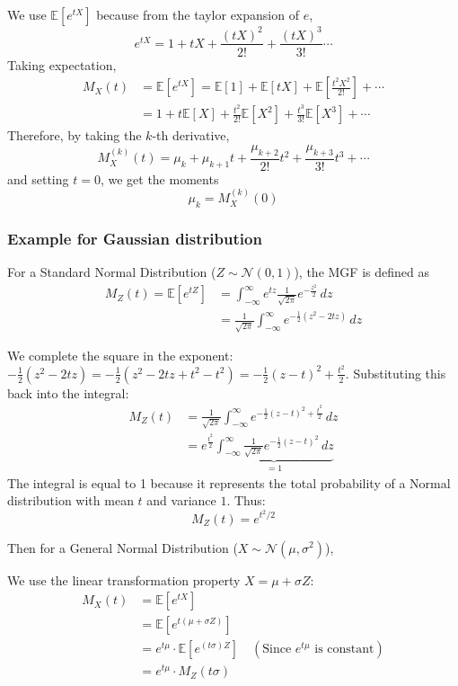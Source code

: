 \documentclass[../Probability.tex]{subfiles}
\begin{document}
\noindent We use $\mathbb{E}[e^{tX}]$ because from the taylor expansion of $e$,
\[e^{tX}=1+tX+\frac{(tX)^2}{2!}+\frac{(tX)^3}{3!}\cdots\]
Taking expectation,
\begin{align*}
    M_X(t)&=\mathbb{E}[e^{tX}]=\mathbb{E}[1]+\mathbb{E}[tX]+\mathbb{E}[\frac{t^2X^2}{2!}]+\cdots \\
    &= 1 + t\mathbb{E}[X] + \frac{t^2}{2!}\mathbb{E}[X^2] + \frac{t^3}{3!}\mathbb{E}[X^3]+\cdots
\end{align*}
Therefore, by taking the $k$-th derivative,
\[M_X^{(k)}(t)=\mu_k + \mu_{k+1}t + \frac{\mu_{k+2}}{2!}t^2 + \frac{\mu_{k+3}}{3!}t^3+\cdots\]
and setting $t=0$,
we get the moments
\[\mu_k=M_X^{(k)}(0)\]

\subsubsection{Example for Gaussian distribution}
\noindent For a Standard Normal Distribution ($Z \sim \mathcal{N}(0, 1)$), the MGF is defined as
\begin{align*}
    M_Z(t) = \mathbb{E}[e^{tZ}] &= \int_{-\infty}^{\infty} e^{tz} \frac{1}{\sqrt{2\pi}} e^{-\frac{z^2}{2}} \, dz \\
           &= \frac{1}{\sqrt{2\pi}} \int_{-\infty}^{\infty} e^{-\frac{1}{2}(z^2 - 2tz)} \, dz
\end{align*}

\noindent We complete the square in the exponent: $-\frac{1}{2}(z^2 - 2tz) = -\frac{1}{2}(z^2 - 2tz + t^2 - t^2) = -\frac{1}{2}(z-t)^2 + \frac{t^2}{2}$.
Substituting this back into the integral:
\begin{align*}
    M_Z(t) &= \frac{1}{\sqrt{2\pi}} \int_{-\infty}^{\infty} e^{-\frac{1}{2}(z-t)^2 + \frac{t^2}{2}} \, dz \\
           &= e^{\frac{t^2}{2}} \underbrace{\int_{-\infty}^{\infty} \frac{1}{\sqrt{2\pi}} e^{-\frac{1}{2}(z-t)^2} \, dz}_{=1}
\end{align*}
The integral is equal to 1 because it represents the total probability of a Normal distribution with mean $t$ and variance $1$. Thus:
\[ M_Z(t) = e^{t^2/2} \]

\noindent Then for a General Normal Distribution ($X \sim \mathcal{N}(\mu, \sigma^2)$),

\noindent We use the linear transformation property $X = \mu + \sigma Z$:
\begin{align*}
    M_X(t) &= \mathbb{E}[e^{tX}] \\
           &= \mathbb{E}[e^{t(\mu + \sigma Z)}] \\
           &= e^{t\mu} \cdot \mathbb{E}[e^{(t\sigma)Z}] \quad (\text{Since } e^{t\mu} \text{ is constant}) \\
           &= e^{t\mu} \cdot M_Z(t\sigma)
\end{align*}
\end{document}
